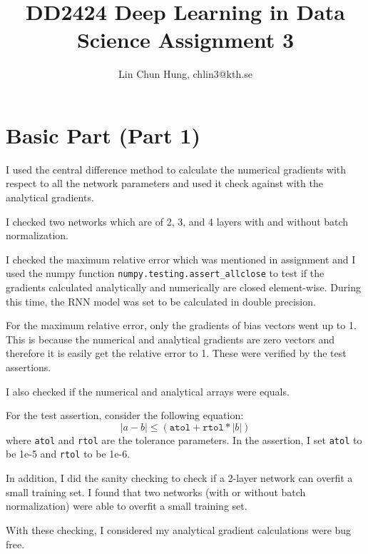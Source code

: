 \documentclass[12pt]{article}
\newenvironment{question}[2][Question]{\begin{trivlist}
\kern10pt
\item[\hskip \labelsep {\bfseries #1}\hskip \labelsep {\bfseries #2.}]}{\end{trivlist}}
\begin{document}
\title{DD2424 Deep Learning in Data Science Assignment 3}
\author{Lin Chun Hung, chlin3@kth.se}

\maketitle

\section{Basic Part (Part 1)}
\begin{question}{i}
    I used the central difference method to calculate the numerical gradients
    with respect to all the network parameters and used it check against with the
    analytical gradients.

    I checked two networks which are of 2, 3, and 4 layers with and without batch normalization.

    I checked the maximum relative error which was mentioned in assignment and I
    used the numpy function \texttt{numpy.testing.assert\_allclose} to test if
    the gradients calculated analytically and numerically are closed element-wise.
    During this time, the RNN model was set to be calculated in double precision.

    For the maximum relative error, only the gradients of bias vectors went up to
    1. This is because the numerical and analytical gradients are zero vectors and
    therefore it is easily get the relative error to 1. These were verified by the
    test assertions.

    I also checked if the numerical and analytical arrays were equals.

    For the test assertion, consider the following equation:
    \begin{equation*}
        |a - b| \leq (\texttt{atol} + \texttt{rtol} * |b|)
    \end{equation*}
    where \texttt{atol} and \texttt{rtol} are the tolerance parameters.
    In the assertion, I set \texttt{atol} to be 1e-5 and \texttt{rtol} to be 1e-6.

    In addition, I did the sanity checking to check if a 2-layer network can overfit
    a small training set. I found that two networks (with or without batch normalization)
    were able to overfit a small training set.

    With these checking, I considered my analytical gradient calculations were bug free.
\end{question}


\begin{question}{ii}

\end{question}
\end{document}
